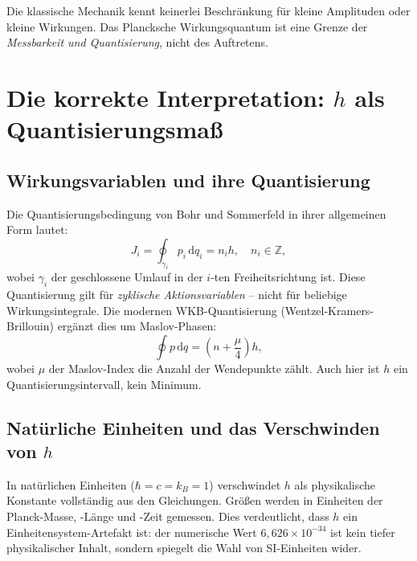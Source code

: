 ﻿\documentclass[12pt,a4paper]{article}
\theoremstyle{plain}
\theoremstyle{definition}
\theoremstyle{remark}
\begin{document}
Die klassische Mechanik kennt keinerlei Beschränkung für kleine Amplituden oder kleine
Wirkungen. Das Plancksche Wirkungsquantum ist eine Grenze der \emph{Messbarkeit und
Quantisierung}, nicht des Auftretens.

\section{Die korrekte Interpretation: $h$ als Quantisierungsmaß}

\subsection{Wirkungsvariablen und ihre Quantisierung}

Die Quantisierungsbedingung von Bohr und Sommerfeld in ihrer allgemeinen Form lautet:
\begin{equation}
  J_i = \oint_{\gamma_i} p_i\,\mathrm{d}q_i = n_i h, \quad n_i \in \mathbb{Z},
\end{equation}
wobei $\gamma_i$ der geschlossene Umlauf in der $i$-ten Freiheitsrichtung ist. Diese
Quantisierung gilt für \emph{zyklische Aktionsvariablen} -- nicht für beliebige
Wirkungsintegrale. Die modernen WKB-Quantisierung (Wentzel-Kramers-Brillouin) ergänzt dies um Maslov-Phasen:
\begin{equation}
  \oint p\,\mathrm{d}q = \left(n + \frac{\mu}{4}\right)h,
\end{equation}
wobei $\mu$ der Maslov-Index die Anzahl der Wendepunkte zählt. Auch hier ist $h$ ein
Quantisierungsintervall, kein Minimum.

\subsection{Natürliche Einheiten und das Verschwinden von $h$}

In natürlichen Einheiten ($\hbar = c = k_B = 1$) verschwindet $h$ als physikalische
Konstante vollständig aus den Gleichungen. Größen werden in Einheiten der Planck-Masse,
-Länge und -Zeit gemessen. Dies verdeutlicht, dass $h$ ein Einheitensystem-Artefakt ist:
der numerische Wert $6{,}626\times 10^{-34}$ ist kein tiefer physikalischer Inhalt,
sondern spiegelt die Wahl von SI-Einheiten wider.
\end{document}
